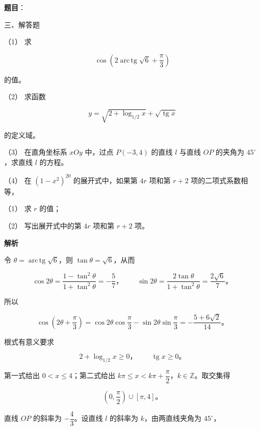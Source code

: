 \begin{answer}

\textbf{题目}：

三、解答题

（1） 求

\nopagebreak[4]
\[
\cos\left(2\operatorname{arc\,tg}\sqrt6+\frac\pi3\right)
\]

的值。

（2） 求函数

\nopagebreak[4]
\[
y=\sqrt{2+\log_{1/2}x}+\sqrt{\operatorname{tg}x}
\]

的定义域。

（3） 在直角坐标系 $xOy$ 中，过点 $P(-3,4)$ 的直线 $l$ 与直线 $OP$ 的夹角为 $45^\circ$，求直线 $l$ 的方程。

（4） 在 $(1-x^2)^{20}$ 的展开式中，如果第 $4r$ 项和第 $r+2$ 项的二项式系数相等，

（1） 求 $r$ 的值；

（2） 写出展开式中的第 $4r$ 项和第 $r+2$ 项。

\textbf{解析}


令 $\theta=\operatorname{arc\,tg}\sqrt6$，则 $\tan\theta=\sqrt6$，从而

\nopagebreak[4]
\[
\cos2\theta=\frac{1-\tan^2\theta}{1+\tan^2\theta}=-\frac57\text{，}\qquad
\sin2\theta=\frac{2\tan\theta}{1+\tan^2\theta}=\frac{2\sqrt6}{7}\text{。}
\]

所以

\nopagebreak[4]
\[
\cos\left(2\theta+\frac\pi3\right)
=\cos2\theta\cos\frac\pi3-\sin2\theta\sin\frac\pi3
=-\frac{5+6\sqrt2}{14}\text{。}
\]


根式有意义要求

\nopagebreak[4]
\[
2+\log_{1/2}x\ge0\text{，}\qquad \operatorname{tg}x\ge0\text{。}
\]

第一式给出 $0<x\le4$；第二式给出 $k\pi\le x<k\pi+\dfrac\pi2$，$k\in\mathbb Z$。取交集得

\nopagebreak[4]
\[
\left(0,\frac\pi2\right)\cup[\pi,4]\text{。}
\]


直线 $OP$ 的斜率为 $-\dfrac43$。设直线 $l$ 的斜率为 $k$，由两直线夹角为 $45^\circ$，


\end{answer}

